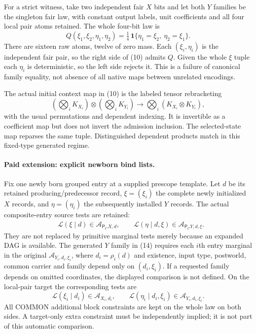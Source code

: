 \documentclass[11pt]{article}
\begin{document}
For a strict witness, take two independent fair $X$ bits and let both $Y$ families be the singleton fair law, with constant output labels, unit coefficients and all four local pair atoms retained. The whole four-bit law is
\[
 Q(\xi_1,\xi_2,\eta_1,\eta_2)
 =\tfrac14\,\mathbf1\{\eta_1=\xi_2,\ \eta_2=\xi_1\}.
\]
There are sixteen raw atoms, twelve of zero mass. Each $(\xi_i,\eta_i)$ is the independent fair pair, so the right side of (10) admits $Q$. Given the whole $\xi$ tuple each $\eta_i$ is deterministic, so the left side rejects it. This is a failure of canonical family equality, not absence of all native maps between unrelated encodings.

The actual initial context map in (10) is the labeled tensor rebracketing
\[
 (\bigotimes_i K_{X_i})\otimes(\bigotimes_i K_{Y_i})
       \longrightarrow\bigotimes_i(K_{X_i}\otimes K_{Y_i}),
\]
with the usual permutations and dependent indexing. It is invertible as a coefficient map but does not invert the admission inclusion. The selected-state map reparses the same tuple. Distinguished dependent products match in this fixed-type generated regime.

\paragraph{Paid extension: explicit newborn bind lists.}
Fix one newly born grouped entry at a supplied prescope template. Let $d$ be its retained producing/predecessor record, $\xi=(\xi_i)$ the complete newly initialized $X$ records, and $\eta=(\eta_i)$ the subsequently installed $Y$ records. The actual composite-entry source tests are retained:
\begin{align*}
 &\mathcal L(\xi\mid d)\in\mathcal A_{\mathsf P_CX,d},\qquad
   \mathcal L(\eta\mid d,\xi)\in\mathcal A_{\mathsf P_CY,d,\xi}.
                                                               \tag{14}
\end{align*}
They are not replaced by primitive marginal tests merely because an expanded DAG is available. The generated $Y$ family in (14) requires each $i$th entry marginal in the original $\mathcal A_{Y_i,d_i,\xi_i}$, where $d_i=\rho_i(d)$ and existence, input type, postworld, common carrier and family depend only on $(d_i,\xi_i)$. If a requested family depends on omitted coordinates, the displayed comparison is not defined. On the local-pair target the corresponding tests are
\[
 \mathcal L(\xi_i\mid d_i)\in\mathcal A_{X_i,d_i},\qquad
 \mathcal L(\eta_i\mid d_i,\xi_i)\in\mathcal A_{Y_i,d_i,\xi_i}.
                                                               \tag{15}
\]
All COMMON additional block constraints are kept on the whole law on both sides. A target-only extra constraint must be independently implied; it is not part of this automatic comparison.
\end{document}
